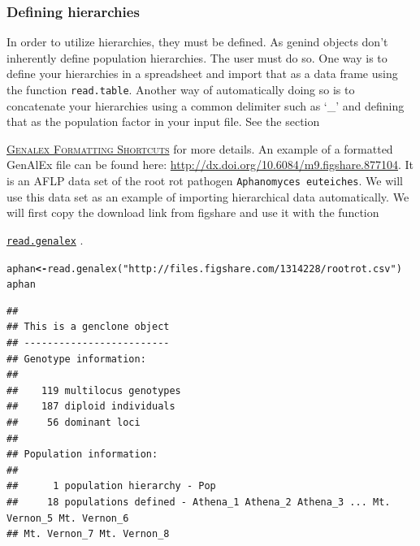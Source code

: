 \documentclass[letterpaper]{article}\usepackage[]{graphicx}\usepackage[]{color}
\makeatletter
\newcommand{\hlstr}[1]{\textcolor[rgb]{0.651,0.522,0}{#1}}%
\newcommand{\hlstd}[1]{\textcolor[rgb]{0,0,0}{#1}}%
\newcommand{\hlkwb}[1]{\textcolor[rgb]{0.502,0.502,0.753}{\textbf{#1}}}%
\newcommand{\hlkwd}[1]{\textcolor[rgb]{0,0.267,0.4}{#1}}%
\newenvironment{kframe}{%
 \def\at@end@of@kframe{}%
 \ifinner\ifhmode%
  \def\at@end@of@kframe{\end{minipage}}%
  \begin{minipage}{\columnwidth}%
 \fi\fi%
 \def\FrameCommand##1{\hskip\@totalleftmargin \hskip-\fboxsep
 \colorbox{shadecolor}{##1}\hskip-\fboxsep
     \hskip-\linewidth \hskip-\@totalleftmargin \hskip\columnwidth}%
 \MakeFramed {\advance\hsize-\width
   \@totalleftmargin\z@ \linewidth\hsize
   \@setminipage}}%
 {\par\unskip\endMakeFramed%
 \at@end@of@kframe}
\newenvironment{knitrout}{}{} %
\newcommand{\tab}{\hspace*{1em}}
\newcommand{\cmdlink}[2]{
  \texttt{\hyperref[#1]{#2}}
}
\newcommand{\seclink}[2]{
  \textsc{\hyperref[#1]{#2}}
}
\makeatother
\begin{document}
\subsubsection{Defining hierarchies}
\label{data.manip:hier:define}

\tab\tab In order to utilize hierarchies, they must be defined. As genind objects
don't inherently define population hierarchies. The user must do so. One way is
to define your hierarchies in a spreadsheet and import that as a data frame using
the function \texttt{read.table}. Another way of automatically
doing so is to concatenate your hierarchies using a common delimiter such as `\_'
and defining that as the population factor in your input file. See the section 
\seclink{intro:import:genalex.short}{Genalex Formatting Shortcuts}for more
details. An example of a formatted GenAlEx file can be found here: 
\url{http://dx.doi.org/10.6084/m9.figshare.877104}. It is an AFLP data set of the
root rot pathogen \texttt{Aphanomyces euteiches}. We will use this data set as 
an example of importing hierarchical data automatically. We will first copy the 
download link from figshare and use it with the function 
\cmdlink{intro:import:read.genalex}{read.genalex}. 

\begin{knitrout}\footnotesize
{}\color{fgcolor}\begin{kframe}
\begin{alltt}
\hlstd{aphan} \hlkwb{<-} \hlkwd{read.genalex}\hlstd{(}\hlstr{"http://files.figshare.com/1314228/rootrot.csv"}\hlstd{)}
\hlstd{aphan}
\end{alltt}
\end{kframe}
\end{knitrout}

\begin{knitrout}\footnotesize
{}\color{fgcolor}\begin{kframe}
\begin{verbatim}
## 
## This is a genclone object
## -------------------------
## Genotype information:
## 
##    119 multilocus genotypes
##    187 diploid individuals
##     56 dominant loci
## 
## Population information:
## 
##      1 population hierarchy - Pop
##     18 populations defined - Athena_1 Athena_2 Athena_3 ... Mt. Vernon_5 Mt. Vernon_6 
## Mt. Vernon_7 Mt. Vernon_8
\end{verbatim}
\end{kframe}
\end{knitrout}
\end{document}
